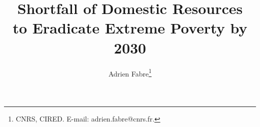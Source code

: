 


% 



% 
% 

% 


\title{Shortfall of Domestic Resources\\ to Eradicate Extreme Poverty by 2030} 

\author{Adrien Fabre\footnote{CNRS, CIRED. E-mail: adrien.fabre@cnrs.fr.}}

